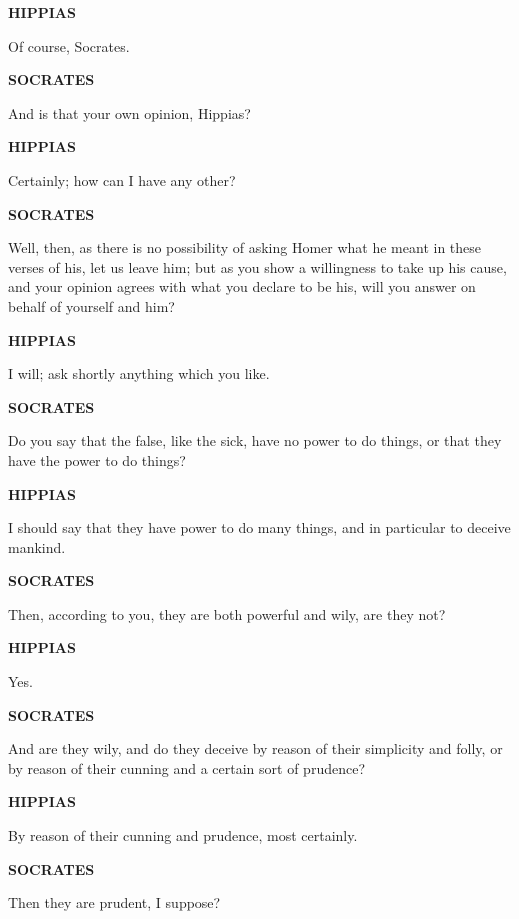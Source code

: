 \documentclass[11pt,letter]{article}
\begin{document}
\par \textbf{HIPPIAS}
\par   Of course, Socrates.

\par \textbf{SOCRATES}
\par   And is that your own opinion, Hippias?

\par \textbf{HIPPIAS}
\par   Certainly; how can I have any other?

\par \textbf{SOCRATES}
\par   Well, then, as there is no possibility of asking Homer what he meant in these verses of his, let us leave him; but as you show a willingness to take up his cause, and your opinion agrees with what you declare to be his, will you answer on behalf of yourself and him?

\par \textbf{HIPPIAS}
\par   I will; ask shortly anything which you like.

\par \textbf{SOCRATES}
\par   Do you say that the false, like the sick, have no power to do things, or that they have the power to do things?

\par \textbf{HIPPIAS}
\par   I should say that they have power to do many things, and in particular to deceive mankind.

\par \textbf{SOCRATES}
\par   Then, according to you, they are both powerful and wily, are they not?

\par \textbf{HIPPIAS}
\par   Yes.

\par \textbf{SOCRATES}
\par   And are they wily, and do they deceive by reason of their simplicity and folly, or by reason of their cunning and a certain sort of prudence?

\par \textbf{HIPPIAS}
\par   By reason of their cunning and prudence, most certainly.

\par \textbf{SOCRATES}
\par   Then they are prudent, I suppose?
\end{document}
